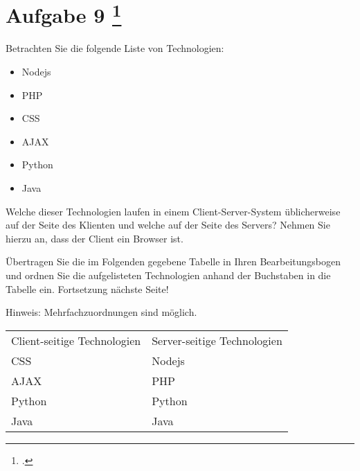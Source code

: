 \documentclass{lehramt-informatik-aufgabe}
\begin{document}
\section{Aufgabe 9
\footcite{66116:2021:03}}

Betrachten Sie die folgende Liste von Technologien:

\begin{itemize}
\item Nodejs

\item PHP

\item CSS

\item AJAX

\item Python

\item Java
\end{itemize}

Welche dieser Technologien laufen in einem Client-Server-System
üblicherweise auf der Seite des Klienten und welche auf der Seite des
Servers? Nehmen Sie hierzu an, dass der Client ein Browser ist.

Übertragen Sie die im Folgenden gegebene Tabelle in Ihren
Bearbeitungsbogen und ordnen Sie die aufgelisteten Technologien anhand
der Buchstaben in die Tabelle ein. Fortsetzung nächste Seite!

Hinweis: Mehrfachzuordnungen sind möglich.

\begin{liAntwort}
\begin{tabular}{ll}
Client-seitige Technologien & Server-seitige Technologien \\
CSS & Nodejs \\
AJAX & PHP \\
Python & Python \\
Java & Java \\
\end{tabular}
\end{liAntwort}
\end{document}

